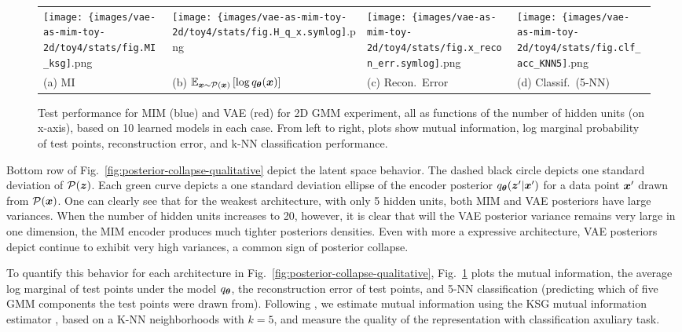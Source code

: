 \begin{figure}[ht]
    \centering
    \setlength{\tabcolsep}{0pt}
    \begin{tabular}{*4{>{\centering\arraybackslash}m{}}}
      \texttt{[image: \{images/vae-as-mim-toy-2d/toy4/stats/fig.MI\_ksg]}.png}
    & \texttt{[image: \{images/vae-as-mim-toy-2d/toy4/stats/fig.H\_q\_x.symlog]}.png}
    & \texttt{[image: \{images/vae-as-mim-toy-2d/toy4/stats/fig.x\_recon\_err.symlog]}.png}
    & \texttt{[image: \{images/vae-as-mim-toy-2d/toy4/stats/fig.clf\_acc\_KNN5]}.png}
    \\
    (a) MI & (b)  $\mathbb{E}_{{\boldsymbol{x}} \sim \mathcal{P}({\boldsymbol{x}})}\left[\log q_{{\boldsymbol \theta}}({\boldsymbol{x}})\right]$ & (c) Recon.\ Error & (d) Classif.\ (5-NN)
    \end{tabular}
    \caption{Test performance for MIM (blue) and VAE (red) for 2D GMM experiment,
    all as functions of the number of hidden units (on x-axis), based on 10 learned
    models in each case. From left to right, plots show mutual information, log marginal 
    probability of test points, reconstruction error, and k-NN classification performance.
    }\label{fig:posterior-collapse-quantitative}
\end{figure}


Bottom row of Fig.\ \ref{fig:posterior-collapse-qualitative}
depict the latent space behavior.  The dashed black circle 
depicts one standard deviation of $\mathcal{P}({\boldsymbol z})$. Each green 
curve depicts a one standard deviation ellipse of the encoder posterior  
$q_{{\boldsymbol \theta}}({\boldsymbol z}' | {\boldsymbol{x}}')$ for a data point ${\boldsymbol{x}}'$ drawn from $\mathcal{P}({\boldsymbol{x}})$.
One can clearly see that for the weakest architecture, with only 5 
hidden units, both MIM and VAE posteriors have large variances.
When the number of hidden units increases to 20, however, it is 
clear that will the VAE posterior variance remains very large in
one dimension, the MIM encoder produces much tighter posteriors 
densities.  Even with more a expressive architecture, VAE posteriors depict
continue to exhibit very high variances, a common sign of posterior collapse. 



To quantify this behavior for each architecture in  
Fig.\ \ref{fig:posterior-collapse-qualitative}, Fig.\ 
\ref{fig:posterior-collapse-quantitative} plots the mutual information, 
the average log marginal of test points under the model $q_{{\boldsymbol \theta}}$,
the reconstruction error of test points, and 5-NN classification
(predicting which of five GMM components the test points were drawn from).
Following  \cite{Hjelm2018}, we estimate mutual information 
using the KSG mutual information estimator \cite{PhysRevE.69.066138,DBLP:journals/corr/GaoOV16},  
based on a K-NN neighborhoods with $k=5$, and measure the quality of the representation with classification axuliary task.

